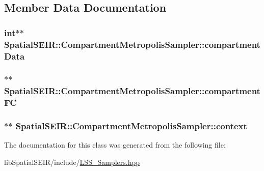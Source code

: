 \subsection{Member Data Documentation}
\hypertarget{classSpatialSEIR_1_1CompartmentMetropolisSampler_a82cb72e43365eddeec151023eca5af54}{
\subsubsection[{compartment\-Data}]{\setlength{\rightskip}{0pt plus 5cm}int$\ast$$\ast$ Spatial\-S\-E\-I\-R\-::\-Compartment\-Metropolis\-Sampler\-::compartment\-Data}}\label{classSpatialSEIR_1_1CompartmentMetropolisSampler_a82cb72e43365eddeec151023eca5af54}
\hypertarget{classSpatialSEIR_1_1CompartmentMetropolisSampler_a917c4ed20e389f460e1cef15aeb51570}{
\subsubsection[{compartment\-F\-C}]{$\ast$$\ast$ Spatial\-S\-E\-I\-R\-::\-Compartment\-Metropolis\-Sampler\-::compartment\-F\-C}}\label{classSpatialSEIR_1_1CompartmentMetropolisSampler_a917c4ed20e389f460e1cef15aeb51570}
\hypertarget{classSpatialSEIR_1_1CompartmentMetropolisSampler_a17778f2c1b66d39a71a8fb6f5f648387}{
\subsubsection[{context}]{$\ast$$\ast$ Spatial\-S\-E\-I\-R\-::\-Compartment\-Metropolis\-Sampler\-::context}}\label{classSpatialSEIR_1_1CompartmentMetropolisSampler_a17778f2c1b66d39a71a8fb6f5f648387}


The documentation for this class was generated from the following file\-:\begin{DoxyCompactItemize}
\item 
lib\-Spatial\-S\-E\-I\-R/include/\hyperlink{LSS__Samplers_8hpp}{L\-S\-S\-\_\-\-Samplers.\-hpp}\end{DoxyCompactItemize}
